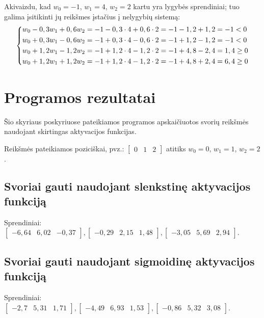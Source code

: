 \documentclass{VUMIFPSbakalaurinis}
\begin{document}
Akivaizdu, kad $w_0 = -1$, $w_1 = 4$, $w_2 = 2$ kartu
yra lygybės sprendiniai; tuo galima įsitikinti jų reikšmes
įstačius į nelygybių sistemą:
\begin{equation*}
  \begin{dcases}
    w_0 - 0,3w_1 + 0,6w_2 = -1 - 0,3 \cdot 4 + 0,6 \cdot 2 = -1 - 1,2 + 1,2 = -1  < 0 \\
    w_0 + 0,3w_1 - 0,6w_2 = -1 + 0,3 \cdot 4 - 0,6 \cdot 2 = -1 + 1,2 - 1,2 = -1< 0 \\
    w_0 + 1,2w_1 - 1,2w_2 = -1 + 1,2 \cdot 4 - 1,2 \cdot 2 = -1 + 4,8 - 2,4 = 1,4 \geq  0 \\
    w_0 + 1,2w_1 + 1,2w_2 = -1 + 1,2 \cdot 4 - 1,2 \cdot 2 = -1 + 4,8 + 2,4 = 6,4 \geq  0
  \end{dcases}
\end{equation*}

\section{Programos rezultatai}
Šio skyriaus poskyriuose pateikiamos programos apskaičiuotos
svorių reikšmės naudojant skirtingas aktyvacijos funkcijas.

Reikšmės pateikiamos poziciškai, pvz.: $
\begin{bmatrix}
  0 & 1 & 2
\end{bmatrix}
$ atitiks
$w_0 = 0$, $w_1 = 1$, $w_2 = 2$.

\subsection{Svoriai gauti naudojant slenkstinę aktyvacijos funkciją}
Sprendiniai:$
\begin{bmatrix}
  -6,64 & 6,02 & -0,37
\end{bmatrix},
\begin{bmatrix}
  -0,29 & 2,15 & 1,48
\end{bmatrix},
\begin{bmatrix}
  -3,05 & 5,69 & 2,94
\end{bmatrix}.
$

\subsection{Svoriai gauti naudojant sigmoidinę aktyvacijos funkciją}
Sprendiniai:$
\begin{bmatrix}
  -2,7 & 5,31 & 1,71
\end{bmatrix},
\begin{bmatrix}
  -4,49 & 6,93 & 1,53
\end{bmatrix},
\begin{bmatrix}
  -0,86 & 5,32 & 3,08
\end{bmatrix}.
$
\end{document}
